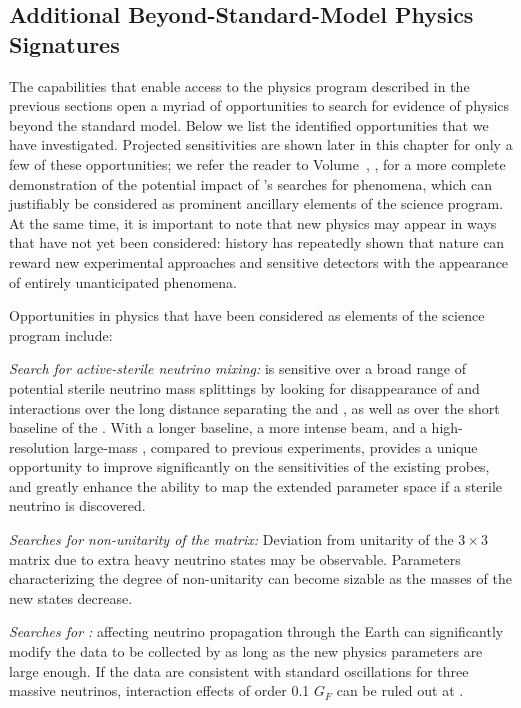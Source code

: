 \subsection{Additional Beyond-Standard-Model Physics Signatures}

The capabilities that enable access to the physics program described 
in the previous sections open a myriad of opportunities to search for 
evidence of physics beyond the standard model.  Below we list the 
identified opportunities that we have investigated.  
Projected sensitivities are shown later in this chapter for only 
a few of these opportunities; we refer the reader to  
Volume~\volnumberphysics{}, \voltitlephysics{}, for a more complete demonstration of 
the potential impact of 's searches for  phenomena,  
which can justifiably be considered as prominent ancillary 
elements of the  science program.  At the same time, it is 
important to note that new physics may appear in ways that have 
not yet been considered: history has repeatedly shown that nature 
can reward new experimental approaches and sensitive detectors 
with the appearance of entirely unanticipated phenomena.

Opportunities in  physics that have been considered 
as elements of the  science program include:

\textit{Search for active-sterile neutrino mixing:}  is sensitive over a broad range of potential sterile neutrino mass splittings by looking for disappearance of  and   interactions over the long distance separating the  and , as well as over the short baseline of the . With a longer baseline, a more intense beam, and a high-resolution large-mass , compared to previous experiments,  provides a unique opportunity to improve significantly on the sensitivities of the existing probes, and greatly enhance the ability to map the extended parameter space if a sterile neutrino is discovered.

\textit{Searches for non-unitarity of the  matrix:} Deviation from 
unitarity of the $3 \times 3$  matrix due to extra heavy 
neutrino states may be observable. 
Parameters characterizing the degree 
of non-unitarity can
become sizable as the masses of the new states decrease.

\textit{Searches for :} %
 affecting neutrino propagation through the Earth can significantly modify the data to be collected by  as long as the new physics parameters are large enough.  If the  data are consistent with standard oscillations for three massive neutrinos, interaction effects of order 0.1 $G_{F}$ can be ruled out at .


